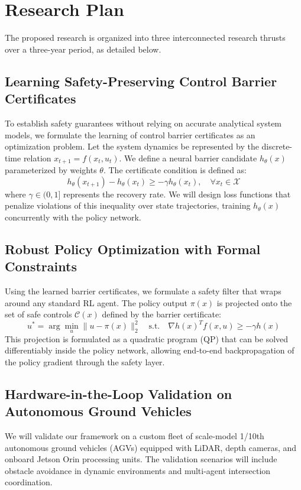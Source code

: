 \section{Research Plan}
The proposed research is organized into three interconnected research thrusts over a three-year period, as detailed below.

\subsection{Learning Safety-Preserving Control Barrier Certificates}
To establish safety guarantees without relying on accurate analytical system models, we formulate the learning of control barrier certificates as an optimization problem. Let the system dynamics be represented by the discrete-time relation $x_{t+1} = f(x_t, u_t)$. We define a neural barrier candidate $h_\theta(x)$ parameterized by weights $\theta$. The certificate condition is defined as:
\begin{equation}
    h_\theta(x_{t+1}) - h_\theta(x_t) \ge -\gamma h_\theta(x_t), \quad \forall x_t \in \mathcal{X}
\end{equation}
where $\gamma \in (0, 1]$ represents the recovery rate. We will design loss functions that penalize violations of this inequality over state trajectories, training $h_\theta(x)$ concurrently with the policy network.

\subsection{Robust Policy Optimization with Formal Constraints}
Using the learned barrier certificates, we formulate a safety filter that wraps around any standard RL agent. The policy output $\pi(x)$ is projected onto the set of safe controls $\mathcal{C}(x)$ defined by the barrier certificate:
\begin{equation}
    u^* = \arg\min_u \|u - \pi(x)\|^2_2 \quad \text{s.t.} \quad \nabla h(x)^T f(x, u) \ge -\gamma h(x)
\end{equation}
This projection is formulated as a quadratic program (QP) that can be solved differentiably inside the policy network, allowing end-to-end backpropagation of the policy gradient through the safety layer.

\subsection{Hardware-in-the-Loop Validation on Autonomous Ground Vehicles}
We will validate our framework on a custom fleet of scale-model 1/10th autonomous ground vehicles (AGVs) equipped with LiDAR, depth cameras, and onboard Jetson Orin processing units. The validation scenarios will include obstacle avoidance in dynamic environments and multi-agent intersection coordination.

